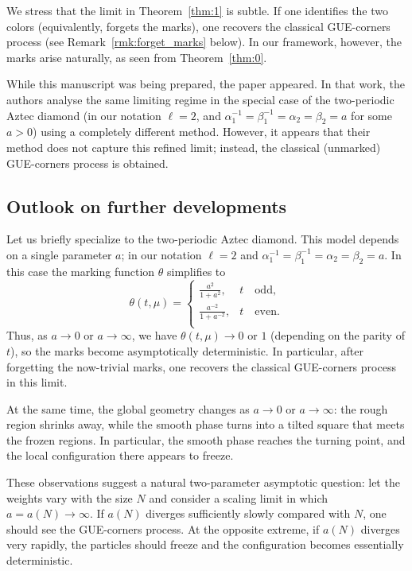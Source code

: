 \documentclass[11pt]{article}
\theoremstyle{plain}
\theoremstyle{definition}
\numberwithin{equation}{section}
\begin{document}
%

We stress that the limit in Theorem~\ref{thm:1} is subtle. If one identifies the two colors (equivalently, forgets the marks), one recovers the classical GUE-corners process (see Remark~\ref{rmk:forget_marks} below). In our framework, however, the marks arise naturally, as seen from Theorem~\ref{thm:0}. 
%

%
While this manuscript was being prepared, the paper \cite{RR25} appeared. In that work, the authors analyse the same limiting regime in the special case of the two-periodic Aztec diamond (in our notation $\ell=2$, and $\alpha_1^{-1}=\beta_1^{-1}=\alpha_2=\beta_2=a$ for some $a>0$) using a completely different method. However, it appears that their method does not capture this refined limit; instead, the classical (unmarked) GUE-corners process is obtained.



\subsection{Outlook on further developments} 
Let us briefly specialize to the two-periodic Aztec diamond. This model depends on a single parameter $a$; in our notation $\ell=2$ and
$\alpha_1^{-1}=\beta_1^{-1}=\alpha_2=\beta_2=a$.
In this case the marking function $\theta$ simplifies to
\begin{equation}
\theta(t,\mu)=
\begin{cases}
\frac{a^2}{1+a^2}, & t \quad \text{odd,} \\
\frac{a^{-2}}{1+a^{-2}}, & t \quad \text{even.} \\
\end{cases}
\end{equation} 
Thus, as $a\to 0$ or $a\to\infty$, we have $\theta(t,\mu)\to 0$ or $1$ (depending on the parity of $t$), so the marks become asymptotically deterministic. In particular, after forgetting the now-trivial marks, one recovers the classical GUE-corners process in this limit.

At the same time, the global geometry changes as $a\to 0$ or $a\to\infty$: the rough region shrinks away, while the smooth phase turns into a tilted square that meets the frozen regions. In particular, the smooth phase reaches the turning point, and the local configuration there appears to freeze.

These observations suggest a natural two-parameter asymptotic question: let the weights vary with the size $N$ and consider a scaling limit in which $a=a(N)\to\infty$. If $a(N)$ diverges sufficiently slowly compared with $N$, one should see the GUE-corners process. At the opposite extreme, if $a(N)$ diverges very rapidly, the particles should freeze and the configuration becomes essentially deterministic. 
\end{document}
